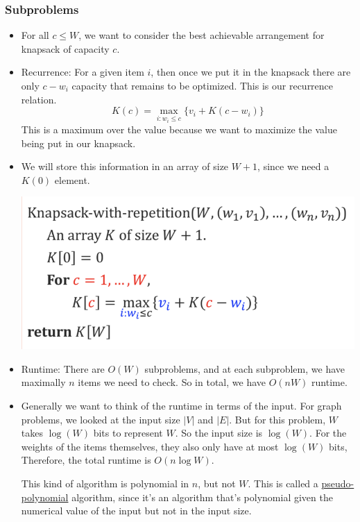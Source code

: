 	\subsubsection{Subproblems}
	\begin{itemize}
		\item For all $c \le W$, we want to consider the best achievable arrangement for knapsack of 
			capacity $c$. 
		\item Recurrence: For a given item $i$, then once we put it in the knapsack there are only $
			c - w_i$ capacity that remains to be optimized. This is our recurrence relation.
			\[
				K(c) = \max_{i : w_i \le c}\{v_i + K(c - w_i)\} 
			\] 
			This is a maximum over the value because we want to maximize the value being put in our 
			knapsack.
		\item We will store this information in an array of size $W + 1$, since we need a $K(0)$ element.
			\begin{center}
				\includegraphics[scale=0.5]{knapsack-repetition.png}
			\end{center}
		\item Runtime: There are $O(W)$ subproblems, and at each subproblem, we have maximally $n$ items
			 we need to check. So in total, we have $O(nW)$ runtime.
		 \item Generally we want to think of the runtime in terms of the input. For graph problems, we looked 
			 at the input size $|V|$ and $|E|$. But for this problem, $W$ takes $\log(W)$ bits to represent 
			 $W$. So the input size is $\log(W)$. For the weights of the items themselves,
			they also only have at most $\log(W)$ bits, Therefore, the total runtime is $O(n \log W)$. 

			This kind of algorithm is polynomial in $n$, but not $W$. This is called a \underline{pseudo-
			polynomial} algorithm, since it's an algorithm that's polynomial given the numerical value 
			of the input but not in the input size.
	\end{itemize}
